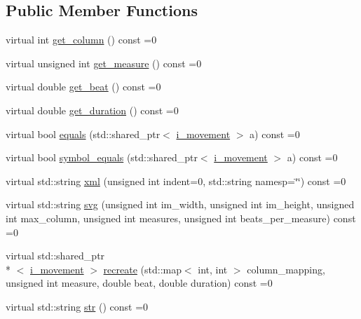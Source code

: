 \subsection*{Public Member Functions}
\begin{DoxyCompactItemize}
\item 
virtual int \hyperlink{classmae_1_1fl_1_1laban_1_1i__movement_a448424f76457ed1dfa28e5d2c774c311}{get\-\_\-column} () const =0
\item 
virtual unsigned int \hyperlink{classmae_1_1fl_1_1laban_1_1i__movement_aa1b18a889adea3d1aa8a5a8af5de2de6}{get\-\_\-measure} () const =0
\item 
virtual double \hyperlink{classmae_1_1fl_1_1laban_1_1i__movement_a2b8ee7b4d5cb5be09be93ff049fbdc68}{get\-\_\-beat} () const =0
\item 
virtual double \hyperlink{classmae_1_1fl_1_1laban_1_1i__movement_ac83194ad9df8fed6c27199e83d35460d}{get\-\_\-duration} () const =0
\item 
virtual bool \hyperlink{classmae_1_1fl_1_1laban_1_1i__movement_a29783771372283ff2cc7deded01b83b1}{equals} (std\-::shared\-\_\-ptr$<$ \hyperlink{classmae_1_1fl_1_1laban_1_1i__movement}{i\-\_\-movement} $>$ a) const =0
\item 
virtual bool \hyperlink{classmae_1_1fl_1_1laban_1_1i__movement_a7b682911356dd13497172280b268ec40}{symbol\-\_\-equals} (std\-::shared\-\_\-ptr$<$ \hyperlink{classmae_1_1fl_1_1laban_1_1i__movement}{i\-\_\-movement} $>$ a) const =0
\item 
virtual std\-::string \hyperlink{classmae_1_1fl_1_1laban_1_1i__movement_acd832b2a6976bfe32eae4bece01ee8f3}{xml} (unsigned int indent=0, std\-::string namesp=\char`\"{}\char`\"{}) const =0
\item 
virtual std\-::string \hyperlink{classmae_1_1fl_1_1laban_1_1i__movement_ab2b0225ae8237b8ae410c797a0319498}{svg} (unsigned int im\-\_\-width, unsigned int im\-\_\-height, unsigned int max\-\_\-column, unsigned int measures, unsigned int beats\-\_\-per\-\_\-measure) const =0
\item 
virtual std\-::shared\-\_\-ptr\\*
$<$ \hyperlink{classmae_1_1fl_1_1laban_1_1i__movement}{i\-\_\-movement} $>$ \hyperlink{classmae_1_1fl_1_1laban_1_1i__movement_a28c8b00c68e291399281bda22e4f01f6}{recreate} (std\-::map$<$ int, int $>$ column\-\_\-mapping, unsigned int measure, double beat, double duration) const =0
\item 
virtual std\-::string \hyperlink{classmae_1_1fl_1_1laban_1_1i__movement_a18322189d1851d3fd0f85c00b1051b57}{str} () const =0
\end{DoxyCompactItemize}

